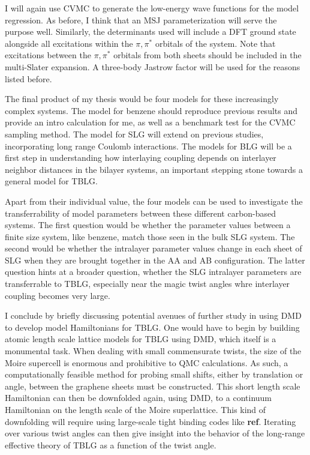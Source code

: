\documentclass[12pt]{article}
\begin{document}
I will again use CVMC to generate the low-energy wave functions for the model regression.
As before, I think that an MSJ parameterization will serve the purpose well.
Similarly, the determinants used will include a DFT ground state alongside all excitations within the $\pi, \pi^*$ orbitals of the system.
Note that excitations between the $\pi, \pi^*$ orbitals from both sheets should be included in the multi-Slater expansion.
A three-body Jastrow factor will be used for the reasons listed before.

The final product of my thesis would be four models for these increasingly complex systems.
The model for benzene should reproduce previous results and provide an intro calculation for me, as well as a benchmark test for the CVMC sampling method.
The model for SLG will extend on previous studies, incorporating long range Coulomb interactions.
The models for BLG will be a first step in understanding how interlaying coupling depends on interlayer neighbor distances in the bilayer systems, an important stepping stone towards a general model for TBLG.

Apart from their individual value, the four models can be used to investigate the transferrability of model parameters between these different carbon-based systems.
The first question would be whether the parameter values between a finite size system, like benzene, match those seen in the bulk SLG system.
The second would be whether the intralayer parameter values change in each sheet of SLG when they are brought together in the AA and AB configuration.
The latter question hints at a broader question, whether the SLG intralayer parameters are transferrable to TBLG, especially near the magic twist angles whre interlayer coupling becomes very large.

I conclude by briefly discussing potential avenues of further study in using DMD to develop model Hamiltonians for TBLG. 
One would have to begin by building atomic length scale lattice models for TBLG using DMD, which itself is a monumental task.
When dealing with small commensurate twists, the size of the Moire supercell is enormous and prohibitive to QMC calculations.
As such, a computationally feasible method for probing small shifts, either by translation or angle, between the graphene sheets must be constructed.
This short length scale Hamiltonian can then be downfolded again, using DMD, to a continuum Hamiltonian on the length scale of the Moire superlattice.
This kind of downfolding will require using large-scale tight binding codes like \textbf{ref}.
Iterating over various twist angles can then give insight into the behavior of the long-range effective theory of TBLG as a function of the twist angle.
\end{document}

